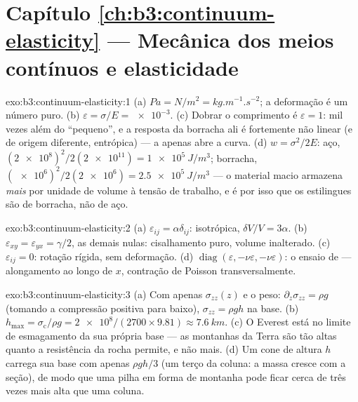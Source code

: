 \section*{Capítulo \ref{ch:b3:continuum-elasticity} --- Mecânica dos meios contínuos e elasticidade}

\begin{solution}{exo:b3:continuum-elasticity:1}
(a) $\unit{Pa} = \unit{N/m^2} = \unit{kg.m^{-1}.s^{-2}}$; a deformação
é um número puro. (b) $\varepsilon = \sigma/E = \num{e-3}$. (c) Dobrar
o comprimento é $\varepsilon = 1$: mil vezes além do ``pequeno'', e a
resposta da borracha ali é fortemente não linear (e de origem
diferente, entrópica) --- a  apenas abre a curva. (d) $w =
\sigma^2/2E$: aço, $(\num{2e8})^2/2(\num{2e11}) =
\qty{1e5}{J/m^3}$; borracha, $(\num{e6})^2/2(\num{2e6}) =
\qty{2.5e5}{J/m^3}$ --- o material macio armazena \emph{mais} por
unidade de volume à tensão de trabalho, e é por isso que os estilingues
são de borracha, não de aço.
\end{solution}

\begin{solution}{exo:b3:continuum-elasticity:2}
(a) $\varepsilon_{ij} = \alpha\delta_{ij}$:  isotrópica,
$\delta V/V = 3\alpha$. (b) $\varepsilon_{xy} = \varepsilon_{yx} =
\gamma/2$, as demais nulas: cisalhamento puro, volume inalterado. (c)
$\varepsilon_{ij} = 0$: rotação rígida, sem deformação. (d)
$\operatorname{diag}(\varepsilon, -\nu\varepsilon, -\nu\varepsilon)$:
o ensaio de  --- alongamento ao longo de $x$, contração de
Poisson transversalmente.
\end{solution}

\begin{solution}{exo:b3:continuum-elasticity:3}
(a) Com apenas $\sigma_{zz}(z)$ e o peso: $\partial_z\sigma_{zz} =
\rho g$ (tomando a compressão positiva para baixo), $\sigma_{zz} = \rho
gh$ na base. (b) $h_{\max} = \sigma_{\text{c}}/\rho g =
\num{2e8}/(2700 \times 9.81) \approx \qty{7.6}{km}$. (c) O Everest
está no limite de esmagamento da sua própria base --- as montanhas da
Terra são tão altas quanto a resistência da rocha permite, e não mais.
(d) Um cone de altura $h$ carrega sua base com apenas $\rho gh/3$ (um
terço da coluna: a massa cresce com a seção), de modo que uma pilha em
forma de montanha pode ficar cerca de três vezes mais alta que uma
coluna.
\end{solution}

